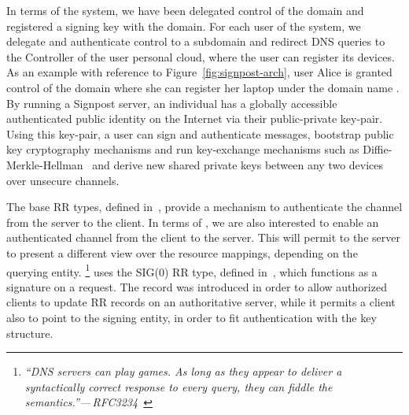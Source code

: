 In terms of the \signpost system, we have been delegated control of the \fqsn{ }
domain and registered a signing key with the  domain.  For each user
of the \signpost system, we delegate and authenticate control to a subdomain and
redirect DNS queries to the \signpost Controller of the user personal cloud,
where the user can register its devices. As an example with reference to
Figure~\ref{fig:signpost-arch}, user Alice is granted control of the domain
 where she can register her laptop under the domain name
.  By running a Signpost server, an individual has a globally
accessible authenticated public identity on the Internet via their
public-private key-pair. Using this key-pair, a user can sign and authenticate
messages, bootstrap public key cryptography mechanisms and run key-exchange
mechanisms such as Diffie-Merkle-Hellman~\cite{RFC2631} and derive new
shared private keys between any two devices over unsecure channels.

The base \dnssec RR types, defined in~\cite{RFC4034}, provide a mechanism to
authenticate the channel from the server to the client. In terms of \signpost,
we are also interested to enable an authenticated channel from the client to the
server. This will permit to the server to present a different view over the
resource mappings, depending on the querying entity.  \footnote{{\em ``DNS
    servers can play games. As long as they appear to deliver a syntactically
    correct response to every query, they can fiddle the
    semantics.''---\,RFC3234~\cite{RFC3234}}} \signpost uses the SIG(0) RR type,
defined in~\cite{RFC2931}, which functions as a signature on a request. The
record was introduced in order to allow authorized clients to update RR records
on an authoritative server, while it permits a client also to point to the
signing entity, in order to fit authentication with the \dnssec key structure. 


